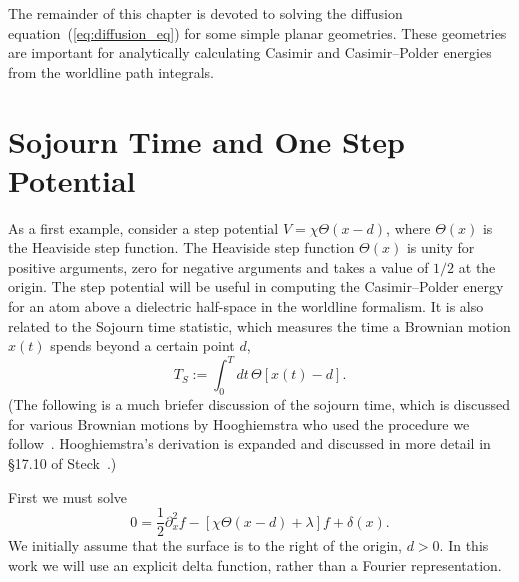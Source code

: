 
    The remainder of this chapter is devoted to solving the diffusion equation~(\ref{eq:diffusion_eq})
    for some simple planar geometries.
    These geometries are important for analytically calculating Casimir and Casimir--Polder
    energies from the worldline path integrals.  
    
\section{Sojourn Time and One Step Potential }

As a first example, consider a step potential $V=\chi\Theta(x-d)$, where $\Theta(x)$ is the Heaviside step
function.  The Heaviside step function $\Theta(x)$ is unity for positive arguments, zero for negative arguments 
and takes a value of $1/2$ at the origin.
The step potential will be useful in computing the Casimir--Polder energy for an atom 
above a dielectric half-space in the worldline formalism.
It is also related to the Sojourn time statistic, which measures the time a Brownian motion $x(t)$ spends 
beyond a certain point $d$,
\begin{equation}
  T_S:= \int_0^T dt\,\Theta[x(t)-d].
\end{equation}
(The following is a much briefer discussion of the sojourn time, 
which is discussed for various Brownian motions by Hooghiemstra who used the procedure 
we follow~\cite{Hooghiemstra2002}.  Hooghiemstra's derivation is expanded and discussed in more detail
in \S17.10 of Steck~\cite{SteckNotes}.)

First we must solve
\begin{equation}
  0 = \frac{1}{2}\partial_x^2 f - [\chi\Theta(x-d)+\lambda]f + \delta(x).
\end{equation}
We initially assume that the surface is to the right of the origin, $d>0$.
In this work we will use an explicit delta function, rather than a Fourier representation.

